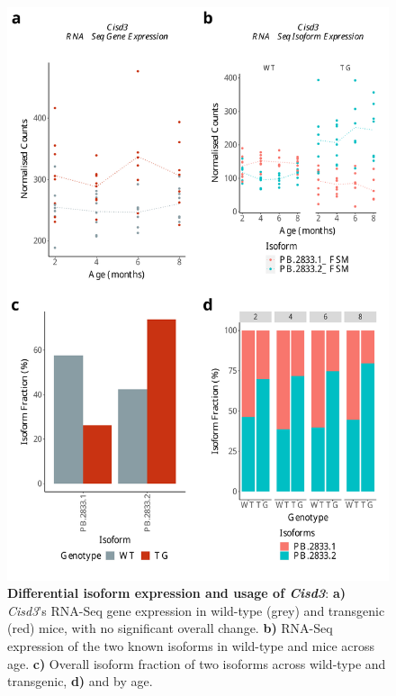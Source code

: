 \begin{figure}[htp]
	\begin{center}
		\includegraphics[page=1,scale = 0.55]{Figures/DIU_notDEG_major.pdf}
	\end{center}
	\captionsetup{width=0.95\textwidth}
	\caption[Differential isoform expression and usage of \textit{Cisd3}]%
	{\textbf{Differential isoform expression and usage of \textit{Cisd3}}: \textbf{a)} \textit{Cisd3}'s RNA-Seq gene expression in wild-type (grey) and transgenic (red) mice, with no significant overall change. \textbf{b)} RNA-Seq expression of the two known isoforms in wild-type and mice across age. \textbf{c)} Overall isoform fraction of two isoforms across wild-type and transgenic, \textbf{d)} and by age.}    
	\label{fig:DIU_Cisd3}
\end{figure}




